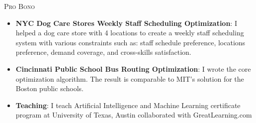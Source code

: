 \documentclass[12pt,letterpaper,roman]{moderncv} %
\begin{document}
{\begin{itemize}


\end{itemize}

}



\bigskip

{\textsc{Pro Bono}}{}{}{}{
\begin{itemize}
\item \textbf{NYC Dog Care Stores Weekly Staff Scheduling Optimization}: I helped a dog 
care store with 4 locations to create a weekly staff scheduling system with various 
constraints such as: staff schedule preference, locations preference, demand coverage, and cross-skills satisfaction. 


\item \textbf{Cincinnati Public School Bus Routing Optimization}: I wrote the core 
 optimization algorithm.
  The result is comparable to MIT's solution for the Boston public schools.

\item \textbf{Teaching}:
    I teach Artificial Intelligence and Machine Learning certificate program at University of Texas, Austin collaborated with GreatLearning.com
\end{itemize}


}







\end{document}

